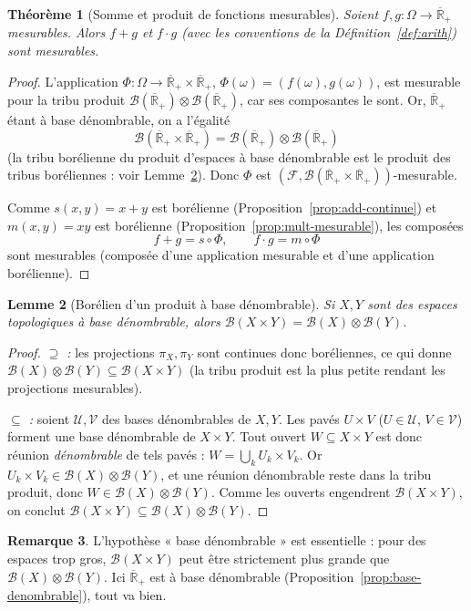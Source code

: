 \documentclass[11pt,a4paper]{article}
\theoremstyle{plain}
\newtheorem{theorem}{Théorème}[section]
\newtheorem{lemma}[theorem]{Lemme}
\theoremstyle{definition}
\newtheorem{remark}[theorem]{Remarque}
\newcommand{\Rpb}{\overline{\mathbb{R}}_+}
\newcommand{\B}{\mathcal{B}}
\newcommand{\F}{\mathcal{F}}
\begin{document}
\begin{theorem}[Somme et produit de fonctions mesurables]\label{thm:somme-produit}
Soient $f,g:\Omega\to\Rpb$ mesurables. Alors $f+g$ et $f\cdot g$ (avec les
conventions de la Définition~\ref{def:arith}) sont mesurables.
\end{theorem}

\begin{proof}
L'application $\Phi:\Omega\to\Rpb\times\Rpb$, $\Phi(\omega)=(f(\omega),g(\omega))$,
est mesurable pour la tribu produit $\B(\Rpb)\otimes\B(\Rpb)$, car ses
composantes le sont. Or, $\Rpb$ étant à base dénombrable, on a l'égalité
\[
\B(\Rpb\times\Rpb)=\B(\Rpb)\otimes\B(\Rpb)
\]
(la tribu borélienne du produit d'espaces à base dénombrable est le produit
des tribus boréliennes : voir Lemme~\ref{lem:borel-produit}). Donc $\Phi$ est
$(\F,\B(\Rpb\times\Rpb))$-mesurable.

Comme $s(x,y)=x+y$ est borélienne (Proposition~\ref{prop:add-continue}) et
$m(x,y)=xy$ est borélienne (Proposition~\ref{prop:mult-mesurable}), les
composées
\[
f+g=s\circ\Phi,\qquad f\cdot g=m\circ\Phi
\]
sont mesurables (composée d'une application mesurable et d'une application
borélienne).
\end{proof}

\begin{lemma}[Borélien d'un produit à base dénombrable]\label{lem:borel-produit}
Si $X,Y$ sont des espaces topologiques à base dénombrable, alors
$\B(X\times Y)=\B(X)\otimes\B(Y)$.
\end{lemma}

\begin{proof}
\emph{$\supseteq$ :} les projections $\pi_X,\pi_Y$ sont continues donc
boréliennes, ce qui donne $\B(X)\otimes\B(Y)\subseteq\B(X\times Y)$ (la tribu
produit est la plus petite rendant les projections mesurables).

\emph{$\subseteq$ :} soient $\mathcal{U},\mathcal{V}$ des bases dénombrables de
$X,Y$. Les pavés $U\times V$ ($U\in\mathcal{U}$, $V\in\mathcal{V}$) forment une
base dénombrable de $X\times Y$. Tout ouvert $W\subseteq X\times Y$ est donc
réunion \emph{dénombrable} de tels pavés :
$W=\bigcup_k U_k\times V_k$. Or $U_k\times V_k\in\B(X)\otimes\B(Y)$, et une
réunion dénombrable reste dans la tribu produit, donc
$W\in\B(X)\otimes\B(Y)$. Comme les ouverts engendrent $\B(X\times Y)$, on
conclut $\B(X\times Y)\subseteq\B(X)\otimes\B(Y)$.
\end{proof}

\begin{remark}
L'hypothèse « base dénombrable » est essentielle : pour des espaces trop gros,
$\B(X\times Y)$ peut être strictement plus grande que $\B(X)\otimes\B(Y)$. Ici
$\Rpb$ est à base dénombrable (Proposition~\ref{prop:base-denombrable}), tout
va bien.
\end{remark}
\end{document}
